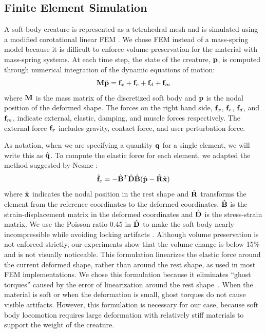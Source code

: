 \subsection{Finite Element Simulation}
A soft body creature is represented as a tetrahedral mesh and
is simulated using a modified corotational linear FEM
\cite{Muller:2002}. We chose FEM instead of a mass-spring model
because it is difficult to enforce volume preservation for the material with mass-spring systems.
At each time step, the state of the creature,
$\mathbf{p}$, is computed through numerical integration of the dynamic
equations of motion:
\begin{equation}
\mathbf{M}\ddot{\mathbf{p}} = \mathbf{f}_{x} + \mathbf{f}_{e}+\mathbf{f}_{d}+\mathbf{f}_{m}
\label{eq:dynamics}
\end{equation}
where $\mathbf{M}$ is the mass matrix of the discretized soft body and
$\mathbf{p}$ is the nodal position of the deformed shape. The forces on
the right hand side, $\mathbf{f}_{x}$, $\mathbf{f}_{e}$, $\mathbf{f}_{d}$, and
$\mathbf{f}_{m}$, indicate external, elastic, damping, and muscle forces
respectively. The external force $\mathbf{f}_{x}$ includes gravity,
contact force, and user perturbation force.

As notation, when we are specifying a quantity $\mathbf{q}$
for a single element, we will write this as $\hat{\mathbf{q}}$.
To compute the elastic force for each element, we adapted the method
suggested by Nesme \etal \cite{NPF05}:
\begin{equation}
\hat{\mathbf{f}}_e=-\hat{\mathbf{B}}^T\hat{\mathbf{D}}\hat{\mathbf{B}}(\hat{\mathbf{p}}-\hat{\mathbf{R}}\hat{\mathbf{x}})
\end{equation}
where $\hat{\mathbf{x}}$ indicates the nodal position in the rest shape
and $\hat{\mathbf{R}}$ transforms the element from the reference
coordinates to the deformed coordinates. $\hat{\mathbf{B}}$ is the
strain-displacement matrix in the deformed coordinates
and $\hat{\mathbf{D}}$ is the stress-strain matrix. We use the Poisson ratio 0.45 in $\hat{\mathbf{D}}$ to make the soft body
nearly incompressible while avoiding locking artifacts \cite{Irving:2007}. Although volume preservation is not enforced strictly, our experiments show that the volume change is below 15\% and is not visually noticeable.
This formulation linearizes the
elastic force around the current deformed shape, rather than around
the rest shape, as used in most FEM implementations. We chose this
formulation because it eliminates ``ghost torques'' caused by the
error of linearization around the rest shape~\cite{NPF05}. When the material is soft or when the deformation is
small, ghost torques do not cause visible artifacts. However, this
formulation is necessary for our case, because soft body locomotion
requires large deformation with relatively stiff materials to support
the weight of the creature.

